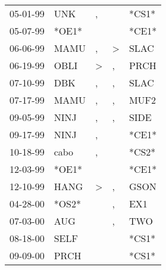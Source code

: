 \begin{supertabular}{p{0.07\textwidth}p{0.06\textwidth}p{0.02\textwidth}p{0.02\textwidth}p{0.06\textwidth}}
 05-01-99\textsuperscript{} &           UNK\textsuperscript{} &                , &               &                            *CS1* \\
 05-07-99\textsuperscript{} &                           *OE1* &                  &               &                            *CE1* \\
 06-06-99\textsuperscript{} &          MAMU\textsuperscript{} &                , &  \textgreater &           SLAC\textsuperscript{} \\
 06-19-99\textsuperscript{} &          OBLI\textsuperscript{} &     \textgreater &             , &           PRCH\textsuperscript{} \\
 07-10-99\textsuperscript{} &           DBK\textsuperscript{} &                , &             , &           SLAC\textsuperscript{} \\
 07-17-99\textsuperscript{} &          MAMU\textsuperscript{} &                , &             , &           MUF2\textsuperscript{} \\
 09-05-99\textsuperscript{} &          NINJ\textsuperscript{} &                , &             , &           SIDE\textsuperscript{} \\
 09-17-99\textsuperscript{} &          NINJ\textsuperscript{} &                , &               &                            *CE1* \\
 10-18-99\textsuperscript{} &          cabo\textsuperscript{} &                , &               &                            *CS2* \\
 12-03-99\textsuperscript{} &                           *OE1* &                  &               &                            *CE1* \\
 12-10-99\textsuperscript{} &          HANG\textsuperscript{} &     \textgreater &             , &           GSON\textsuperscript{} \\
 04-28-00\textsuperscript{} &                           *OS2* &                  &             , &            EX1\textsuperscript{} \\
 07-03-00\textsuperscript{} &           AUG\textsuperscript{} &                  &             , &            TWO\textsuperscript{} \\
 08-18-00\textsuperscript{} &          SELF\textsuperscript{} &                  &               &                            *CS1* \\
 09-09-00\textsuperscript{} &          PRCH\textsuperscript{} &                  &               &                            *CS1* \\

\end{supertabular}
